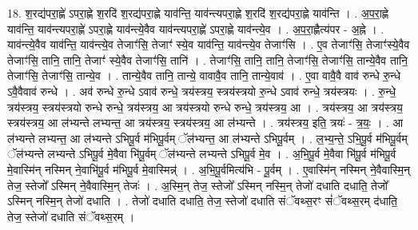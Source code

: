 \documentclass[17pt]{extarticle}
\begin{document}
18. श॒रद्य॑परा॒ह्णे॑ ऽपरा॒ह्णे श॒रदि॑ श॒रद्य॑परा॒ह्णे याव॑न्ति॒ याव॑न्त्यपरा॒ह्णे श॒रदि॑ श॒रद्य॑परा॒ह्णे याव॑न्ति । . अ॒प॒रा॒ह्णे याव॑न्ति॒ याव॑न्त्यपरा॒ह्णे॑ ऽपरा॒ह्णे याव॑न्त्ये॒वैव याव॑न्त्यपरा॒ह्णे॑ ऽपरा॒ह्णे याव॑न्त्ये॒व । . अ॒प॒रा॒ह्णैत्य॑पर - अ॒ह्ने । . याव॑न्त्ये॒वैव याव॑न्ति॒ याव॑न्त्ये॒व तेजाꣳ॑सि॒ तेजाꣳ॑ स्ये॒व याव॑न्ति॒ याव॑न्त्ये॒व तेजाꣳ॑सि । . ए॒व तेजाꣳ॑सि॒ तेजाꣳ॑स्ये॒वैव तेजाꣳ॑सि॒ तानि॒ तानि॒ तेजाꣳ॑ स्ये॒वैव तेजाꣳ॑सि॒ तानि॑ । . तेजाꣳ॑सि॒ तानि॒ तानि॒ तेजाꣳ॑सि॒ तेजाꣳ॑सि॒ तान्ये॒वैव तानि॒ तेजाꣳ॑सि॒ तेजाꣳ॑सि॒ तान्ये॒व । . तान्ये॒वैव तानि॒ तान्ये॒ वावावै॒व तानि॒ तान्ये॒वाव॑ । . ए॒वा वावै॒वै वाव॑ रुन्धे रु॒न्धे ऽवै॒वैवाव॑ रुन्धे । . अव॑ रुन्धे रु॒न्धे ऽवाव॑ रुन्धे॒ त्रय॑स्त्रय॒ स्त्रय॑स्त्रयो रु॒न्धे ऽवाव॑ रुन्धे॒ त्रय॑स्त्रयः । . रु॒न्धे॒ त्रय॑स्त्रय॒ स्त्रय॑स्त्रयो रुन्धे रुन्धे॒ त्रय॑स्त्रय॒ आ त्रय॑स्त्रयो रुन्धे रुन्धे॒ त्रय॑स्त्रय॒ आ । . त्रय॑स्त्रय॒ आ त्रय॑स्त्रय॒ स्त्रय॑स्त्रय॒ आ ल॑भ्यन्ते लभ्यन्त॒ आ त्रय॑स्त्रय॒ स्त्रय॑स्त्रय॒ आ ल॑भ्यन्ते । . त्रय॑स्त्रय॒ इति॒ त्रयः॑ - त्र॒यः॒ । . आ ल॑भ्यन्ते लभ्यन्त॒ आ ल॑भ्यन्ते ऽभिपू॒र्व म॑भिपू॒र्वम् ॅल॑भ्यन्त॒ आ ल॑भ्यन्ते ऽभिपू॒र्वम् । . ल॒भ्य॒न्ते॒ ऽभि॒पू॒र्व म॑भिपू॒र्वम् ॅल॑भ्यन्ते लभ्यन्ते ऽभिपू॒र्व मे॒वैवा भि॑पू॒र्वम् ॅल॑भ्यन्ते लभ्यन्ते ऽभिपू॒र्व मे॒व । . अ॒भि॒पू॒र्व मे॒वैवा भि॑पू॒र्व म॑भिपू॒र्व मे॒वास्मि॑न् नस्मिन् ने॒वाभि॑पू॒र्व म॑भिपू॒र्व मे॒वास्मिन्न्॑ । . अ॒भि॒पू॒र्वमित्य॑भि - पू॒र्वम् । . ए॒वास्मि॑न् नस्मिन् ने॒वैवास्मि॒न् तेज॒ स्तेजो᳚ ऽस्मिन् ने॒वैवास्मि॒न् तेजः॑ । . अ॒स्मि॒न् तेज॒ स्तेजो᳚ ऽस्मिन् नस्मि॒न् तेजो॑ दधाति दधाति॒ तेजो᳚ ऽस्मिन् नस्मि॒न् तेजो॑ दधाति । . तेजो॑ दधाति दधाति॒ तेज॒ स्तेजो॑ दधाति संॅवथ्स॒रꣳ सं॑ॅवथ्स॒रम् द॑धाति॒ तेज॒ स्तेजो॑ दधाति संॅवथ्स॒रम् । \newline
\end{document}
